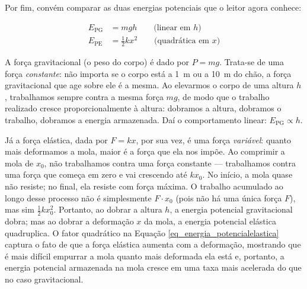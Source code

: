 Por fim, convém comparar as duas energias potenciais que o leitor agora conhece:
%

\begin{align}
      E_\text{PG} &= mgh \qquad \text{(linear em } h\text{)} \nonumber \\
      E_\text{PE} &= \tfrac{1}{2}kx^2 \qquad \text{(quadrática em } x\text{)} \nonumber
\end{align}



A força gravitacional (o peso do corpo) é dado por $P = mg$. Trata-se de uma força \textit{constante}: não importa se o corpo está a 1~m ou a 10~m do chão, a força gravitacional que age sobre ele é a mesma. Ao elevarmos o corpo de
uma altura $h$, trabalhamos sempre contra a mesma força $mg$, de modo que o trabalho
realizado cresce proporcionalmente à altura: dobramos a altura, dobramos o trabalho,
dobramos a energia armazenada. Daí o comportamento linear: $E_\text{PG} \propto h$.

Já a força elástica, dada por $F = kx$, por sua vez, é uma força \textit{variável}: quanto mais
deformamos a mola, maior é a força que ela nos impõe. Ao comprimir a mola de $x_0$,
não trabalhamos contra uma força constante --- trabalhamos contra uma força que começa
em zero e vai crescendo até $kx_0$. No início, a mola quase não resiste; no final, ela
resiste com força máxima. O trabalho acumulado ao longo desse processo não é simplesmente
$F \cdot x_0$ (pois não há uma única força $F$), mas sim $\frac{1}{2}kx_0^2$. Portanto, ao dobrar a altura $h$, a energia potencial gravitacional dobra; mas ao dobrar a deformação $x$ da mola, a energia potencial elástica quadruplica. O fator quadrático na Equação \eqref{eq_energia_potencialelastica} captura o fato de que a força elástica aumenta com a deformação, mostrando que é mais difícil empurrar a mola quanto mais deformada ela está e, portanto, a energia potencial armazenada na mola cresce em uma taxa mais acelerada do que no caso gravitacional.


